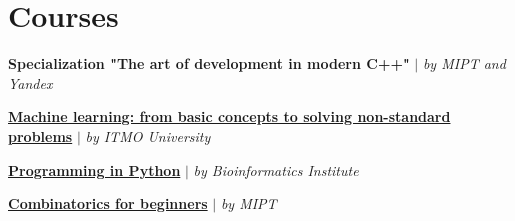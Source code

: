 \section{Courses}
    \vspace{-5pt}
    \resumeSubHeadingListStart
      \resumeProjectHeading
          {\textbf{Specialization "The art of development in modern C++"} $|$ \emph{by MIPT and Yandex}}{}
          \resumeItemListStart
          \resumeItemListEnd
         \resumeSubHeadingListEnd
             \vspace{5pt}

          \textbf{\href{https://github.com/d351d3r/site/raw/master/static/media/ml_itmo_cert.pdf}{Machine learning: from basic concepts to solving non-standard problems}} $|$ \emph{by ITMO University}
              \vspace{5pt}

          \textbf{\href{https://stepik.org/cert/887425}{Programming in Python}} $|$ \emph{by Bioinformatics Institute}
              \vspace{5pt}

          \textbf{\href{https://www.coursera.org/account/accomplishments/verify/UUHW34F52YQY}{Combinatorics for beginners}} $|$ \emph{by MIPT}
\vspace{-15pt}